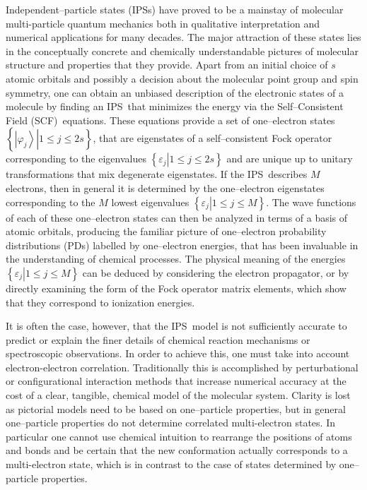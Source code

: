 \documentclass[aps,preprint]{revtex4}%
\begin{document}
Independent--particle states (IPSs) have proved to be a mainstay of molecular
multi-particle quantum mechanics both in qualitative interpretation and
numerical applications for many decades. The major attraction of these states
lies in the conceptually concrete and chemically understandable pictures of
molecular structure and properties that they provide. Apart from an initial
choice of $s$ atomic orbitals and possibly a decision about the molecular
point group and spin symmetry, one can obtain an unbiased description of the
electronic states of a molecule by finding an IPS\ that minimizes the energy
via the Self--Consistent Field (SCF)\ equations. These equations provide a set
of one--electron states $\left\{  \left.  \left\vert \varphi_{j}\right\rangle
\right\vert 1\leq j\leq2s\right\}  $, that are eigenstates of a
self--consistent Fock operator corresponding to the eigenvalues $\left\{
\left.  \varepsilon_{j}\right\vert 1\leq j\leq2s\right\}  $ and are unique up
to unitary transformations that mix degenerate eigenstates. If the
IPS\ describes $M$ electrons, then in general it is determined by the
one--electron eigenstates corresponding to the $M$ lowest eigenvalues
$\left\{  \left.  \varepsilon_{j}\right\vert 1\leq j\leq M\right\}  $. The
wave functions of each of these one--electron states can then be analyzed in
terms of a basis of atomic orbitals, producing the familiar picture of
one--electron probability distributions (PDs) labelled by one--electron
energies, that has been invaluable in the understanding of chemical processes.
The physical meaning of the energies $\left\{  \left.  \varepsilon
_{j}\right\vert 1\leq j\leq M\right\}  $ can be deduced by considering the
electron propagator, or by directly examining the form of the Fock operator
matrix elements, which show that they correspond to ionization energies.

It is often the case, however, that the IPS\ model is not sufficiently
accurate to predict or explain the finer details of chemical reaction
mechanisms or spectroscopic observations. In order to achieve this, one must
take into account electron-electron correlation. Traditionally this is
accomplished by perturbational or configurational interaction methods that
increase numerical accuracy at the cost of a clear, tangible, chemical model
of the molecular system. Clarity is lost as pictorial models need to be based
on one--particle properties, but in general one--particle properties do not
determine correlated multi-electron states. In particular one cannot use
chemical intuition to rearrange the positions of atoms and bonds and be
certain that the new conformation actually corresponds to a multi-electron
state, which is in contrast to the case of states determined by one--particle properties.
\end{document}
